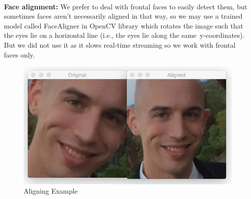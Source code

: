 \paragraph{}
\textbf{Face alignment:}\newline
We prefer to deal with frontal faces to easily detect them, but sometimes faces aren’t necessarily aligned in that way, so we may use a trained model called FaceAligner in OpenCV library which rotates the image such that the eyes lie on a horizontal line (i.e., the eyes lie along the same y-coordinates).\newline
But we did not use it as it slows real-time streaming so we work with frontal faces only.
\begin{figure}[H]
	\centering
	\includegraphics[width=\linewidth]{images/Aligning.jpg}
	\caption{Aligning Example}
\end{figure}
